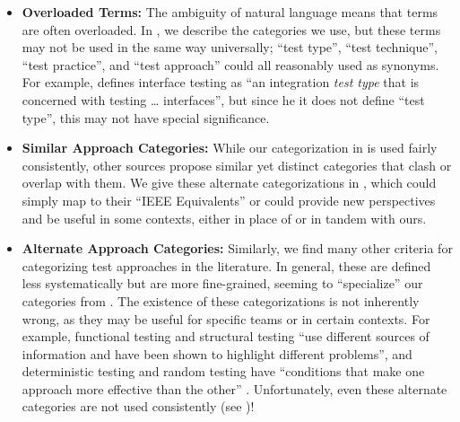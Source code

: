 \begin{itemize}
    \item \textbf{Overloaded Terms:} The ambiguity of natural language means
          that terms are often overloaded. In , we describe
          the categories we use, but these terms may not be used in the same
          way universally; ``test type'', ``test technique'', ``test practice'',
          and ``test approach'' could all reasonably used as synonyms. For
          example, \citet[p.~45\ifnotpaper, emphasis added\fi]{Kam2008}
          defines interface testing as ``an integration \emph{test type} that
          is concerned with testing \dots{} interfaces'', but since \ifnotpaper
              he \else it \fi does not define ``test type'', this may not have
          special significance.
    \item \textbf{Similar Approach Categories:} While our categorization in
           is used fairly consistently, other sources
          \citep[such as][]{SWEBOK2024,BarbosaEtAl2006} propose similar yet
          distinct categories that clash or overlap with them. We give these
          alternate categorizations in , which could simply
          map to their ``IEEE Equivalents'' or could provide new perspectives
          and be useful in some contexts, either in place of or in tandem with
          ours.
    \item {}\label{alt-cats}
          \textbf{Alternate Approach Categories:} Similarly, we find many other
          criteria for categorizing test approaches in the literature.
          In general, these are defined less systematically but are more
          fine-grained, seeming to ``specialize'' our categories from
          . The existence of these categorizations is not
          inherently wrong, as they may be useful for specific teams or in
          certain contexts. For example, functional testing and structural
          testing ``use different sources of information and have been shown to
          highlight different problems'', and deterministic testing and random
          testing have ``conditions that make one approach more effective than
          the other'' \citep[p.~5\=/16]{SWEBOK2024}. Unfortunately, even these
          alternate categories are not used consistently
          (see )!

\end{itemize}
